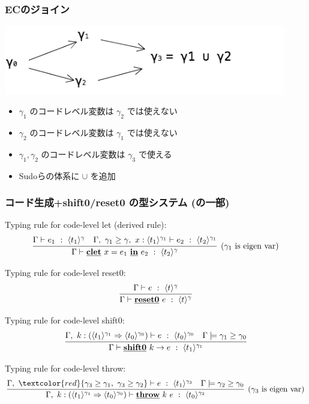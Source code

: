 \documentclass[dvipdfmx,cjk,xcolor=dvipsnames,envcountsect,notheorems,12pt]{beamer}
\newcommand\cResetz{\underline{\textbf{reset0}}}
\newcommand\cShiftz{\underline{\textbf{shift0}}}
\newcommand\cThrow{\underline{\textbf{throw}}}
\newcommand\cresetz[1]{\cResetz~{#1}}
\newcommand\cshiftz[2]{\cShiftz~{#1}\to{#2}}
\newcommand\cthrow[2]{\cThrow~{#1}~{#2}}
\newcommand\cLet{\underline{\textbf{clet}}}
\newcommand\cIn{\underline{\textbf{in}}}
\newcommand\clet[3]{\cLet~{#1}={#2}~\cIn~{#3}}
\newcommand\codeT[2]{\langle{#1}\rangle^{#2}}
\newcommand\contT[2]{({#1} \Rightarrow {#2})}
\newcommand\ord{\ge}
\newcommand\red[1]{\textcolor{red}{#1}}
\theoremstyle{definition}
\begin{document}
\begin{frame}
  \frametitle{ECのジョイン}
  \flushleft
  \includegraphics[clip,height=3cm]{../img/ecgraph.png}
  \begin{itemize}
  \item<2-> $\gamma_1$ のコードレベル変数は $\gamma_2$ では使えない
  \item<3-> $\gamma_2$ のコードレベル変数は $\gamma_1$ では使えない
  \item<4-> $\gamma_1, \gamma_2$ のコードレベル変数は $\gamma_3$ で使える
  \item<5->[$\Rightarrow$] Sudoらの体系に $\cup$ を追加
  \end{itemize}
\end{frame}

\begin{frame}[fragile]
  \frametitle{コード生成+shift0/reset0 の型システム (の一部)}
  Typing rule for code-level let (derived rule):
  \[
    \infer[(\gamma_1~\text{is eigen var})]
    {\Gamma \vdash \clet{x}{e_1}{e_2} ~:~ \codeT{t_2}{\gamma}}
    {\Gamma \vdash e_1 ~:~ \codeT{t_1}{\gamma}
      &\Gamma,~\gamma_1 \ord \gamma,~x:\codeT{t_1}{\gamma_1} \vdash
      e_2 ~:~ \codeT{t_2}{\gamma_1}
    }
  \]

  Typing rule for code-level reset0:
  \[
    \infer{\Gamma \vdash \cresetz{e} ~:~ \codeT{t}{\gamma}}
    {\Gamma \vdash e ~:~ \codeT{t}{\gamma}}
  \]

  Typing rule for code-level shift0:
  \[
    \infer{\Gamma \vdash \cshiftz{k}{e} ~:~ \codeT{t_1}{\gamma_1}}
    {\Gamma,~k:\contT{\codeT{t_1}{\gamma_1}}{\codeT{t_0}{\gamma_0}}
      \vdash e ~:~ \codeT{t_0}{\gamma_0}
      & \Gamma \models \gamma_1 \ord \gamma_0
    }
  \]

  Typing rule for code-level throw:
  \[
    \infer[(\gamma_3~\text{is eigen var})]
    {\Gamma,~k:\contT{\codeT{t_1}{\gamma_1}}{\codeT{t_0}{\gamma_0}}
      \vdash \cthrow{k}{e} ~:~ \codeT{t_0}{\gamma_2}}
    {\Gamma,~
      \red{\gamma_3 \ord \gamma_1,~
      \gamma_3 \ord \gamma_2}
      \vdash e ~:~ \codeT{t_1}{\gamma_3}
      & \Gamma \models \gamma_2 \ord \gamma_0
    }
  \]

\end{frame}
\end{document}
